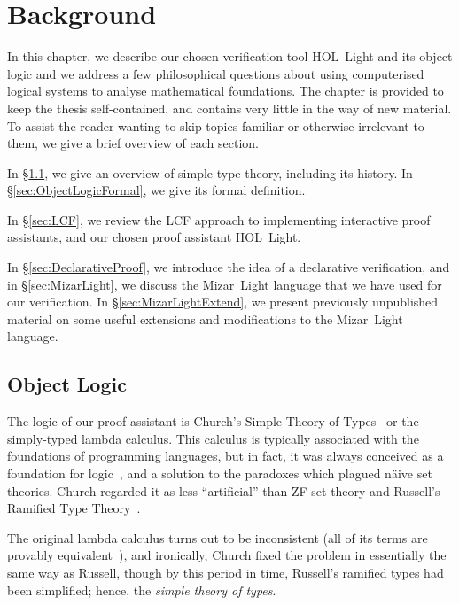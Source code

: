 \chapter{Background}\label{chapter:Background}
In this chapter, we describe our chosen verification tool HOL~Light and its object logic and we address a few philosophical questions about using computerised logical systems to analyse mathematical foundations. The chapter is provided to keep the thesis self-contained, and contains very little in the way of new material. To assist the reader wanting to skip topics familiar or otherwise irrelevant to them, we give a brief overview of each section.

In \S\ref{sec:ObjectLogic}, we give an overview of simple type theory, including its history. In \S\ref{sec:ObjectLogicFormal}, we give its formal definition.

In \S\ref{sec:LCF}, we review the LCF approach to implementing interactive proof assistants, and our chosen proof assistant HOL~Light.

In \S\ref{sec:DeclarativeProof}, we introduce the idea of a declarative verification, and in \S\ref{sec:MizarLight}, we discuss the Mizar~Light language that we have used for our verification. In \S\ref{sec:MizarLightExtend}, we present previously unpublished material on some useful extensions and modifications to the Mizar~Light language.

\section{Object Logic}\label{sec:ObjectLogic}
The logic of our proof assistant is Church's Simple Theory of Types~\cite{ChurchTheoryOfTypes} or the simply-typed lambda calculus. This calculus is typically associated with the foundations of programming languages, but in fact, it was always conceived as a foundation for logic~\cite{UntypedTheoryLambdaCalculus}, and a solution to the paradoxes which plagued n\"{a}ive set theories. Church regarded it as less ``artificial'' than ZF set theory and Russell's Ramified Type Theory~\cite{RussellTheoryOfTypes}.

The original lambda calculus turns out to be inconsistent (all of its terms are provably equivalent~\cite{InconsistencyLambdaCalculus}), and ironically, Church fixed the problem in essentially the same way as Russell, though by this period in time, Russell's ramified types had been simplified; hence, the \emph{simple theory of types}.


